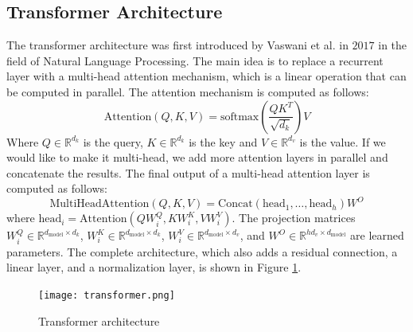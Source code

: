 \subsection{Transformer Architecture}
The transformer architecture was first introduced by Vaswani et al.
\cite{vaswani2017attention} in $2017$ in the field of Natural Language
Processing. The main idea is to replace a recurrent layer with a multi-head
attention mechanism, which is a linear operation that can be computed in
parallel.
The attention mechanism is computed as follows:
\begin{equation}
  \label{eq:attention}
  \text{Attention}(Q,K,V) = \text{softmax}(\frac{QK^T}{\sqrt{d_k}})V
\end{equation}
Where $Q \in \mathbb{R}^{d_k}$ is the query, $K \in \mathbb{R}^{d_k}$ is the key
and $V \in \mathbb{R}^{d_v}$ is the value. If we would like to make it
multi-head, we add more attention layers in parallel and concatenate the
results. The final output of a multi-head attention layer is computed as
follows:
\begin{equation}
  \label{eq:multiheadattention}
  \text{MultiHeadAttention}(Q,K,V) = \text{Concat}(\text{head}_1, \dots,
  \text{head}_h)W^O
\end{equation}
where $\text{head}_i = \text{Attention}(QW_i^Q, KW_i^K, VW_i^V)$.
The projection matrices $W_i^Q \in \mathbb{R}^{d_{\text{model}} \times d_k}$,
$W_i^K \in \mathbb{R}^{d_{\text{model}} \times d_k}$, $W_i^V \in
\mathbb{R}^{d_{\text{model}} \times d_v}$, and $W^O \in \mathbb{R}^{hd_v \times
d_\text{model}}$ are learned parameters. The complete architecture, which also
adds a residual connection, a linear layer, and a normalization layer, is shown
in Figure \ref{fig:transformer}.
\begin{figure}[h]
  \centering
  \texttt{[image: transformer.png]}
  \caption{Transformer architecture}
  \label{fig:transformer}
\end{figure}

